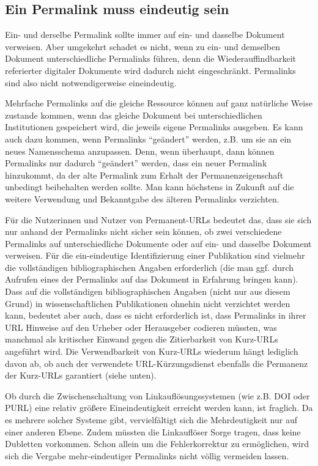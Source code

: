 \documentclass[12pt, a4paper]{article}
\begin{document}
\subsection{Ein Permalink muss eindeutig sein}
\label{permalinks-muessen-mehr-eindeutig-aber-nicht-unbedingt-ein-eindeutig-sein}

Ein- und derselbe Permalink sollte immer auf ein- und dasselbe
Dokument verweisen. Aber umgekehrt schadet es nicht, wenn zu ein- und
demselben Dokument unterschiedliche Permalinks führen, denn die
Wiederauffindbarkeit referierter digitaler Dokumente wird dadurch
nicht eingeschränkt. Permalinks sind also nicht notwendigerweise
eineindeutig.

Mehrfache Permalinks auf die gleiche Ressource können auf ganz natürliche
Weise zustande kommen, wenn das gleiche Dokument bei
unterschiedlichen Institutionen gespeichert wird, die jeweils eigene
Permalinks ausgeben. Es kann auch dazu kommen, wenn Permalinks
"`geändert"' werden, z.B. um sie an ein neues Namensschema anzupassen.
Denn, wenn überhaupt, dann können Permalinks nur dadurch "`geändert"'
werden, dass ein neuer Permalink hinzukommt, da der alte Permalink zum
Erhalt der Permanenzeigenschaft unbedingt beibehalten werden
sollte. Man kann höchstens in Zukunft auf die weitere Verwendung und
Bekanntgabe des älteren Permalinks verzichten.

Für die Nutzerinnen und Nutzer von Permanent-URLs bedeutet das, dass
sie sich nur anhand der Permalinks nicht sicher sein können, ob zwei
verschiedene Permalinks auf unterschiedliche Dokumente oder auf ein-
und dasselbe Dokument verweisen. Für die ein-eindeutige
Identifizierung einer Publikation sind vielmehr die vollständigen
bibliographischen Angaben erforderlich (die man ggf. durch Aufrufen
eines der Permalinks auf das Dokument in Erfahrung bringen kann). Dass
auf die vollständigen bibliographischen Angaben (nicht nur aus diesem
Grund) in wissenschaftlichen Publikationen ohnehin nicht verzichtet
werden kann, bedeutet aber auch, dass es nicht erforderlich ist, dass
Permalinks in ihrer URL Hinweise auf den Urheber oder Herausgeber
codieren müssten, was manchmal als kritischer Einwand gegen die
Zitierbarkeit von Kurz-URLs angeführt wird. Die Verwendbarkeit von
Kurz-URLs wiederum hängt lediglich davon ab, ob auch der verwendete
URL-Kürzungsdienst ebenfalls die Permanenz der Kurz-URLs garantiert
(siehe unten).

Ob durch die Zwischenschaltung von Linkauflösungssystemen (wie
z.B. DOI oder PURL) eine relativ größere Eineindeutigkeit erreicht
werden kann, ist fraglich. Da es mehrere solcher Systeme gibt,
vervielfältigt sich die Mehrdeutigkeit nur auf einer anderen Ebene.
Zudem müssten die Linkauflöser Sorge tragen, dass keine Dubletten
vorkommen. Schon allein um die Fehlerkorrektur zu ermöglichen, wird
sich die Vergabe mehr-eindeutiger Permalinks nicht völlig
vermeiden lassen.
\end{document}
